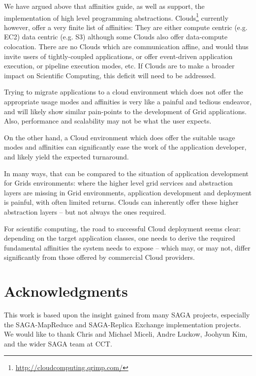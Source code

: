 \documentclass{article}
\newcommand{\up}{\vspace*{-1em}}
\begin{document}
 We have argued above that affinities guide, as well as support, the
 implementation of high level programming abstractions.
 Clouds\footnote{\url{http://cloudcomputing.qrimp.com/}} currently
 however, offer a very finite list of affinities: They are either
 compute centric (e.g. EC2)
 data centric (e.g. S3)
 although some Clouds also offer data-compute colocation.  
 There are no Clouds which are communication affine, and would thus
 invite users of tightly-coupled applications, or offer event-driven
 application execution, or pipeline execution modes, etc.  If Clouds
 are to make a broader impact on Scientific Computing, this deficit
 will need to be addressed. 

 Trying to migrate applications to a cloud environment which does not
 offer the appropriate usage modes and affinities is very like a
 painful and tedious endeavor, and will likely show similar
 pain-points to the development of Grid applications.  Also,
 performance and scalability may not be what the user expects.

 On the other hand, a Cloud environment which does offer the suitable
 usage modes and affinities can significantly ease the work of the
 application developer, and likely yield the expected turnaround.

 In many ways, that can be compared to the situation of application
 development for Grids environments: where the higher level grid
 services and abstraction layers are missing in Grid environments,
 application development and deployment is painful, with often limited
 returns.  Clouds can inherently offer these higher abstraction layers
 -- but not always the ones required.

 For scientific computing, the road to successful Cloud deployment
 seems clear: depending on the target application classes, one needs
 to derive the required fundamental affinities the system needs to
 expose -- which may, or may not, differ significantly from those
 offered by commercial Cloud providers.


\up
\section{Acknowledgments}
\label{sec:acks}

 This work is based upon the insight gained from many SAGA projects,
 especially the SAGA-MapReduce and SAGA-Replica Exchange
 implementation projects. We would like to thank Chris and Michael
 Miceli, Andre Luckow, Joohyun Kim, and the wider SAGA team at CCT.

\footnotesize


\end{document}

